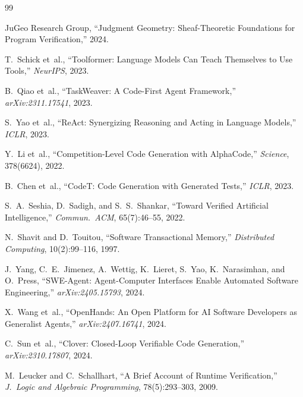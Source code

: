 \documentclass[11pt]{article}
\begin{document}
\begin{thebibliography}{99}

JuGeo Research Group, ``Judgment Geometry: Sheaf-Theoretic Foundations
for Program Verification,'' 2024.

T.~Schick et~al., ``Toolformer: Language Models Can Teach Themselves
to Use Tools,'' \emph{NeurIPS}, 2023.

B.~Qiao et~al., ``TaskWeaver: A Code-First Agent Framework,''
\emph{arXiv:2311.17541}, 2023.

S.~Yao et~al., ``ReAct: Synergizing Reasoning and Acting in Language
Models,'' \emph{ICLR}, 2023.

Y.~Li et~al., ``Competition-Level Code Generation with AlphaCode,''
\emph{Science}, 378(6624), 2022.

B.~Chen et~al., ``CodeT: Code Generation with Generated Tests,''
\emph{ICLR}, 2023.

S.~A.~Seshia, D.~Sadigh, and S.~S.~Shankar,
``Toward Verified Artificial Intelligence,''
\emph{Commun.\ ACM}, 65(7):46--55, 2022.

N.~Shavit and D.~Touitou, ``Software Transactional Memory,''
\emph{Distributed Computing}, 10(2):99--116, 1997.

J.~Yang, C.~E.~Jimenez, A.~Wettig, K.~Lieret, S.~Yao, K.~Narasimhan,
and O.~Press, ``SWE-Agent: Agent-Computer Interfaces Enable Automated
Software Engineering,'' \emph{arXiv:2405.15793}, 2024.

X.~Wang et~al., ``OpenHands: An Open Platform for AI Software
Developers as Generalist Agents,'' \emph{arXiv:2407.16741}, 2024.

C.~Sun et~al., ``Clover: Closed-Loop Verifiable Code Generation,''
\emph{arXiv:2310.17807}, 2024.

M.~Leucker and C.~Schallhart, ``A Brief Account of Runtime
Verification,'' \emph{J.\ Logic and Algebraic Programming},
78(5):293--303, 2009.

\end{thebibliography}
\end{document}
